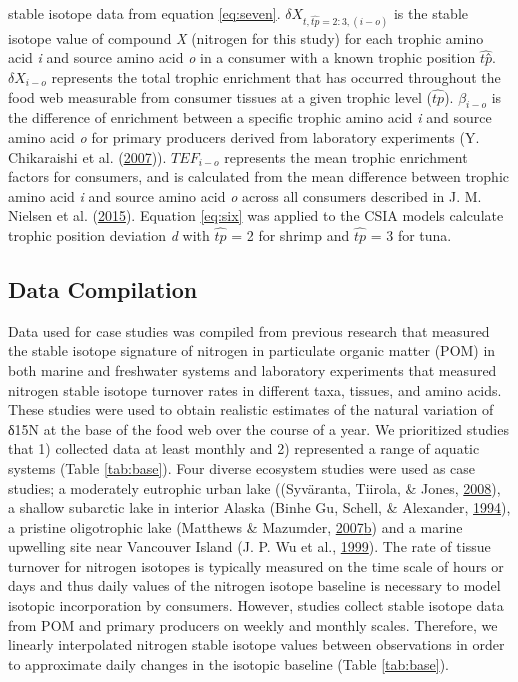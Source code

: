 \documentclass [11pt, proquest] {uwthesis}[2015/03/03]
\begin{document}
stable isotope data from equation \eqref{eq:seven}.
\(\delta X_{t,\widehat{tp}=2:3,(i-o)}\) is the stable isotope value of
compound \emph{X} (nitrogen for this study) for each trophic amino acid
\emph{i} and source amino acid \emph{o} in a consumer with a known
trophic position \(\widehat{tp}\)̂. \(\delta X_{i-o}\) represents the
total trophic enrichment that has occurred throughout the food web
measurable from consumer tissues at a given trophic level
(\(\widehat{tp}\)). \(\beta_{i-o}\) is the difference of enrichment
between a specific trophic amino acid \emph{i} and source amino acid
\emph{o} for primary producers derived from laboratory experiments (Y.
Chikaraishi et al. (\protect\hyperlink{ref-Chikaraishi2007}{2007})).
\(TEF_{i-o}\) represents the mean trophic enrichment factors for
consumers, and is calculated from the mean difference between trophic
amino acid \emph{i} and source amino acid \emph{o} across all consumers
described in J. M. Nielsen et al.
(\protect\hyperlink{ref-Nielsen2015}{2015}). Equation \eqref{eq:six} was
applied to the CSIA models calculate trophic position deviation \emph{d}
with \(\widehat{tp}\) = 2 for shrimp and \(\widehat{tp}\) = 3 for tuna.

\subsection{Data Compilation}\label{data-compilation}

Data used for case studies was compiled from previous research that
measured the stable isotope signature of nitrogen in particulate organic
matter (POM) in both marine and freshwater systems and laboratory
experiments that measured nitrogen stable isotope turnover rates in
different taxa, tissues, and amino acids. These studies were used to
obtain realistic estimates of the natural variation of δ15N at the base
of the food web over the course of a year. We prioritized studies that
1) collected data at least monthly and 2) represented a range of aquatic
systems (Table \ref{tab:base}). Four diverse ecosystem studies were used
as case studies; a moderately eutrophic urban lake ((Syväranta, Tiirola,
\& Jones, \protect\hyperlink{ref-Syvaranta2008}{2008}), a shallow
subarctic lake in interior Alaska (Binhe Gu, Schell, \& Alexander,
\protect\hyperlink{ref-Gu1994}{1994}), a pristine oligotrophic lake
(Matthews \& Mazumder,
\protect\hyperlink{ref-Mathews2007}{2007}\protect\hyperlink{ref-Mathews2007}{b})
and a marine upwelling site near Vancouver Island (J. P. Wu et al.,
\protect\hyperlink{ref-Wu1999}{1999}). The rate of tissue turnover for
nitrogen isotopes is typically measured on the time scale of hours or
days and thus daily values of the nitrogen isotope baseline is necessary
to model isotopic incorporation by consumers. However, studies collect
stable isotope data from POM and primary producers on weekly and monthly
scales. Therefore, we linearly interpolated nitrogen stable isotope
values between observations in order to approximate daily changes in the
isotopic baseline (Table \ref{tab:base}).
\end{document}

